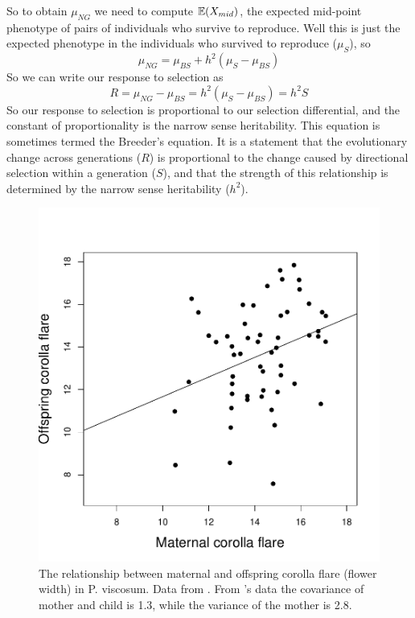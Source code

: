 So to obtain $\mu_{NG}$ we need to compute $\mathbb{E}(X_{mid})$, the expected
mid-point phenotype of pairs of individuals who survive to
reproduce. Well this is just the expected phenotype in the individuals
who survived to reproduce ($\mu_{S}$), so
\begin{equation}
\mu_{NG} = \mu_{BS} +
h^2 (\mu_S - \mu_{BS})
\end{equation}
So we can write our response to selection as
\begin{equation}
R = \mu_{NG} -\mu_{BS}  =
h^2 (\mu_S - \mu_{BS}) = h^2 S \label{breeders_eqn}
\end{equation}
So our response to selection is proportional to our selection
differential, and the constant of proportionality is the narrow sense
heritability. This equation is sometimes termed the Breeder's
equation. It is a statement that the evolutionary change across
generations ($R$) is proportional to the change caused by directional selection
within a generation ($S$), and that the strength of this relationship is
determined by the narrow sense heritability ($h^2$). \\




\begin{figure}
\begin{center}
\includegraphics[width= 0.6 \textwidth]{Journal_figs/Quant_gen/Galen_flower_herit/Galen_corolla_flare.pdf} 
\end{center}
\caption{The relationship between maternal and offspring corolla flare (flower
  width) in P. viscosum. Data from \citet{galen:96}. From \citeauthor{galen:96}'s data the covariance of mother and child is 1.3, while the variance of the mother is 2.8.} \label{fig:Galen_corolla}  
\end{figure}

